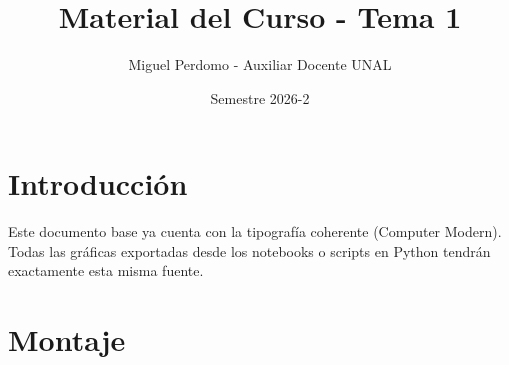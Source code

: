\documentclass[12pt]{article}
\title{Material del Curso - Tema 1}
\author{Miguel Perdomo - Auxiliar Docente UNAL}
\date{Semestre 2026-2}
\begin{document}
\maketitle

\section{Introducción}
Este documento base ya cuenta con la tipografía coherente (Computer Modern). 
Todas las gráficas exportadas desde los notebooks o scripts en Python 
tendrán exactamente esta misma fuente.

\section{Montaje}
% 
\end{document}
